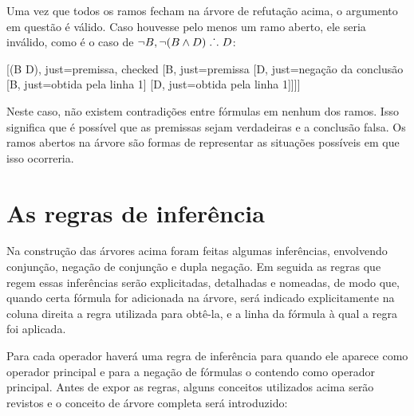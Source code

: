 Uma vez que todos os ramos fecham na árvore de refutação acima, o argumento em questão é válido.
Caso houvesse pelo menos um ramo aberto, ele seria inválido, como é o caso de $\neg B, \neg(B \wedge D) \mathrel{\ldotp\dot{}\,\ldotp} D$:

\begin{center}
\begin{tableau}
	{
	}
	[\enot(B \eand D), just={premissa}, checked
	[\enot B, just={premissa}
	[\enot D, just={negação da conclusão}
		[\enot B, just={obtida pela linha 1}]
		[\enot D, just={obtida pela linha 1}]]]]
\end{tableau}
\end{center}

Neste caso, não existem contradições entre fórmulas em nenhum dos ramos.
Isso significa que é possível que as premissas sejam verdadeiras e a conclusão falsa.
Os ramos abertos na árvore são formas de representar as situações possíveis em que isso ocorreria.

\section{As regras de inferência}

Na construção das árvores acima foram feitas algumas inferências, envolvendo conjunção, negação de conjunção e dupla negação.
Em seguida as regras que regem essas inferências serão explicitadas, detalhadas e nomeadas, de modo que, quando certa fórmula for adicionada na árvore, será indicado explicitamente na coluna direita a regra utilizada para obtê-la, e a linha da fórmula à qual a regra foi aplicada.

Para cada operador haverá uma regra de inferência para quando ele aparece como operador principal e para a negação de fórmulas o contendo como operador principal.
Antes de expor as regras, alguns conceitos utilizados acima serão revistos e o conceito de árvore completa será introduzido: 


